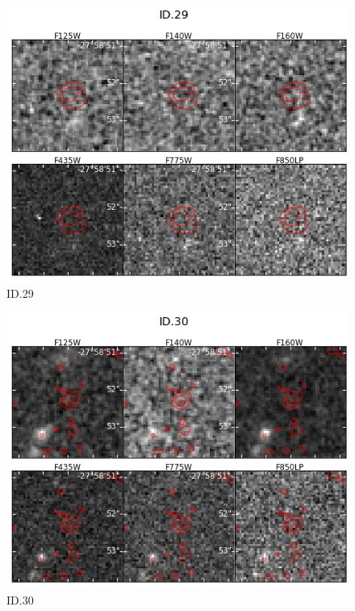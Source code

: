 \begin{figure}[tbp]
\centering \includegraphics[width=160mm]{Matched/ASPECS_Cutout_28.jpg}
\caption{ID.29}
\label{fig:Match_Three}
\end{figure}

\begin{figure}[tbp]
\centering \includegraphics[width=160mm]{Matched/ASPECS_Cutout_29.jpg}
\caption{ID.30}
\label{fig:Match_Three}
\end{figure}

